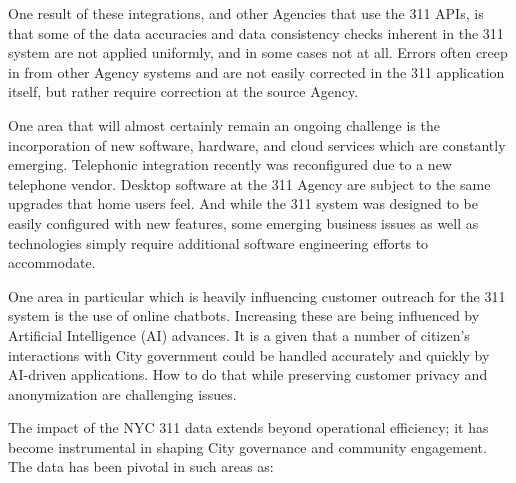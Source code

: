 \documentclass[12pt, titlepage]{article}
\begin{document}
One result of these integrations, and other Agencies that use the 311 APIs, is that some of the data accuracies
and data consistency checks inherent in the 311 system are not applied uniformly, and in some cases not at all.
Errors often creep in from other Agency systems and are not easily corrected in the 311 application itself,
but rather require correction at the source Agency.

One area that will almost certainly remain an ongoing challenge is the incorporation of new software, hardware,
and cloud services which are constantly emerging.  Telephonic integration recently was reconfigured due to a new
telephone vendor. Desktop software at the 311 Agency are subject to the same upgrades that home users feel. And while the 
311 system was designed to be easily configured with new features, some emerging business issues as well as
technologies simply require additional software engineering efforts to accommodate.

One area in particular which is heavily influencing customer outreach for the 311 system is the use of
online chatbots. Increasing these are being influenced by Artificial Intelligence (AI) advances. It is a given that
a number of citizen's interactions with City government could be handled accurately and quickly by AI-driven
applications. How to do that while preserving customer privacy and anonymization are challenging issues. 	

The impact of the NYC 311 data extends beyond operational efficiency;
it has become instrumental in shaping City governance and community
engagement. The data has been pivotal in such areas as:
\end{document}
